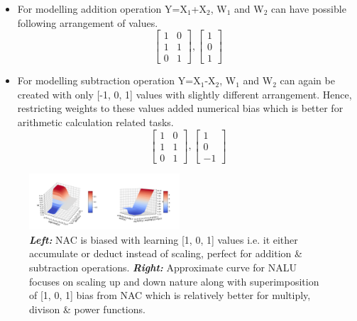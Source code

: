 \documentclass[conference]{IEEEtran}
\begin{document}
\begin{itemize}
\item For modelling addition operation Y=X$_1$+X$_2$, W$_1$ and W$_2$ can have possible following arrangement of values.
\[
\begin{bmatrix}
    1  &  0      \\
    1  &  1      \\
    0  &  1
\end{bmatrix}
,
\begin{bmatrix}
    1        \\
    0  		 \\
    1      
\end{bmatrix} 
\]

\item For modelling subtraction operation Y=X$_1$-X$_2$, W$_1$ and W$_2$ can again be created with only [-1, 0, 1] values with slightly  different arrangement. Hence, restricting weights to these values added numerical bias which is better for arithmetic calculation related tasks.
\[
\begin{bmatrix}
    1  &  0      \\
    1  &  1      \\
    0  &  1
\end{bmatrix}
,
\begin{bmatrix}
    1        \\
    0  		 \\
    -1      
\end{bmatrix} 
\]

\end{itemize}

\begin{figure}[!h]
\centering
\includegraphics[width=0.50\textwidth]{_assets/NAC&NALU.png}
\caption{\textbf{\textit{Left: }}NAC is biased with learning [1, 0, 1] values i.e. it either accumulate or deduct instead of scaling, perfect for addition \& subtraction operations.
\textbf{\textit{Right: }}Approximate curve for NALU focuses on scaling up and down nature along with superimposition of [1, 0, 1] bias from NAC which is relatively better for multiply, divison \& power functions. }
\label{fig2}
\end{figure}
\end{document}
